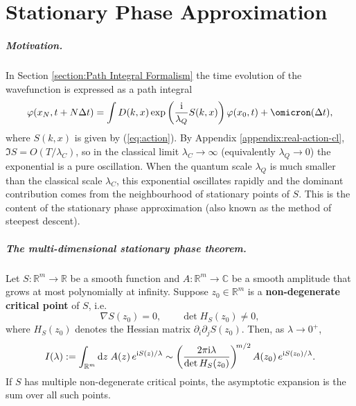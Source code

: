 \documentclass{book}
\newcommand{\assign}{:=}
\newcommand{\mathd}{\mathrm{d}}
\newcommand{\mathi}{\mathrm{i}}
\newcommand{\mathpi}{\pi}
\newcommand{\tmstrong}[1]{\textbf{#1}}
\begin{document}
\chapter{Stationary Phase Approximation}\label{appendix:Stationary Phase
Approximation}

\paragraph{Motivation.} In Section \ref{section:Path Integral Formalism} the
time evolution of the wavefunction is expressed as a path integral
\[ \varphi (x_N, t + N \Delta t) = \int D (k, x) \exp \left(
   \frac{\mathi}{\lambda_Q} S (k, x) \right) \varphi (x_0, t) + \omicron
   (\Delta t), \]
where $S (k, x)$ is given by (\ref{eq:action}). By Appendix
\ref{appendix:real-action-cl}, $\Im S = O (T / \lambda_C)$, so in the
classical limit $\lambda_C \to \infty$ (equivalently $\lambda_Q \to 0$)
the exponential is a pure oscillation.
When the quantum scale $\lambda_Q$ is much smaller than the classical scale
$\lambda_C$, this exponential oscillates rapidly and the dominant
contribution comes from the neighbourhood of stationary points of $S$.
This is the content of the stationary phase approximation (also known as
the method of steepest descent).

\paragraph{The multi-dimensional stationary phase theorem.} Let $S :
\mathbb{R}^m \to \mathbb{R}$ be a smooth function and $A : \mathbb{R}^m \to
\mathbb{C}$ be a smooth amplitude that grows at most polynomially at infinity.
Suppose $z_0 \in \mathbb{R}^m$ is a {\tmstrong{non-degenerate critical point}}
of $S$, i.e.
\[ \nabla S (z_0) = 0, \qquad \det H_S (z_0) \neq 0, \]
where $H_S (z_0)$ denotes the Hessian matrix $\partial_i \partial_j S (z_0)$.
Then, as $\lambda \to 0^+$,
\[ I (\lambda) \assign \int_{\mathbb{R}^m} \mathd z \hspace{0.27em} A (z) 
   \hspace{0.17em} e^{\mathi S (z) / \lambda} \sim \left( \frac{2 \mathpi
   \mathi \lambda}{\det H_S (z_0)} \right)^{\hspace{-0.17em} m / 2} A (z_0) 
   \hspace{0.17em} e^{\mathi S (z_0) / \lambda} . \]
If $S$ has multiple non-degenerate critical points, the asymptotic expansion
is the sum over all such points.
\end{document}
